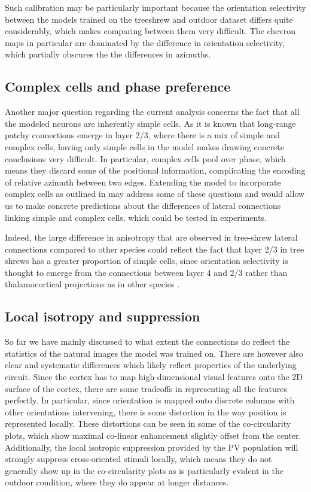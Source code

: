 Such calibration may be particularly important because the orientation
selectivity between the models trained on the treeshrew and outdoor
dataset differs quite considerably, which makes comparing between them
very difficult. The chevron maps in particular are dominated by the
difference in orientation selectivity, which partially obscures the
the differences in azimuths.

\subsection{Complex cells and phase preference}

Another major question regarding the current analysis concerns the
fact that all the modeled neurons are inherently simple cells. As it
is known that long-range patchy connections emerge in layer 2/3, where
there is a mix of simple and complex cells, having only simple cells
in the model makes drawing concrete conclusions very difficult. In
particular, complex cells pool over phase, which means they discard
some of the positional information, complicating the encoding of
relative azimuth between two edges. Extending the model to incorporate
complex cells as outlined in \cite{Antolik2010} may address some of
these questions and would allow us to make concrete predictions about
the differences of lateral connections linking simple and complex
cells, which could be tested in experiments.

Indeed, the large difference in anisotropy that are observed in
tree-shrew lateral connections compared to other species could reflect
the fact that layer 2/3 in tree shrews has a greater proportion of
simple cells, since orientation selectivity is thought to emerge from
the connections between layer 4 and 2/3 rather than thalamocortical
projections as in other species \citep{VanHooser2013}.

\subsection{Local isotropy and suppression}

So far we have mainly discussed to what extent the connections do
reflect the statistics of the natural images the model was trained
on. There are however also clear and systematic differences which
likely reflect properties of the underlying circuit. Since the cortex
has to map high-dimensional visual features onto the 2D surface of the
cortex, there are some tradeoffs in representing all the features
perfectly. In particular, since orientation is mapped onto discrete
columns with other orientations intervening, there is some distortion
in the way position is represented locally.  These distortions can be
seen in some of the co-circularity plots, which show maximal co-linear
enhancement slightly offset from the center. Additionally, the local
isotropic suppression provided by the PV population will strongly
suppress cross-oriented stimuli locally, which means they do not
generally show up in the co-circularity plots as is particularly
evident in the outdoor condition, where they do appear at longer
distances.

